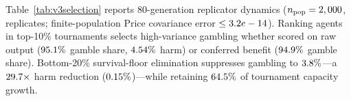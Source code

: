 Table~\ref{tab:v3selection} reports 80-generation replicator dynamics (\(n_{\mathrm{pop}} = 2,000\), \VThreeSelRuleReps{} replicates; finite-population Price covariance error \(\le 3.2e-14\)). Ranking agents in top-10\% tournaments selects high-variance gambling whether scored on raw output (\(95.1\%\) gamble share, \(4.54\%\) harm) or conferred benefit (\(94.9\%\) gamble share). Bottom-20\% survival-floor elimination suppresses gambling to \(3.8\%\)---a \(29.7\times\) harm reduction (\(0.15\%\))---while retaining \(64.5\%\) of tournament capacity growth.


